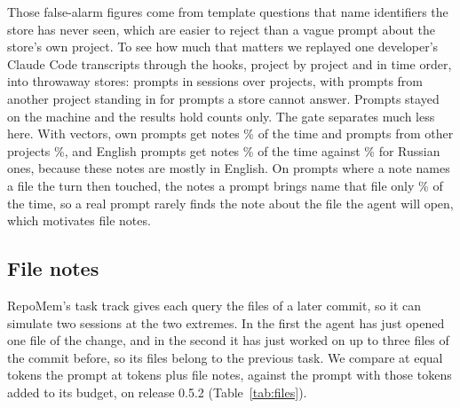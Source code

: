 \begin{table}[t]\centering\scriptsize
\caption{Query gate at  tokens. ``Spoke'' is the share of questions that got any notes. Own questions: their count, recall without and with the gate, and the share still answered with it. Foreign questions: the share that got notes without and with the gate. The main test uses twelve sampled streams and the shipped gates, and other rows are out of fold. RepoMem dev, holdout and earlier tests are repositories used in development.}\label{tab:gate}

\end{table}

Those false-alarm figures come from template questions that name identifiers the store has never seen, which are easier to reject than a vague prompt about the store's own project. To see how much that matters we replayed one developer's Claude Code transcripts through the hooks, project by project and in time order, into throwaway stores:  prompts in  sessions over  projects, with prompts from another project standing in for prompts a store cannot answer. Prompts stayed on the machine and the results hold counts only. The gate separates much less here. With vectors, own prompts get notes \% of the time and prompts from other projects \%, and English prompts get notes \% of the time against \% for Russian ones, because these notes are mostly in English. On prompts where a note names a file the turn then touched, the notes a prompt brings name that file only \% of the time, so a real prompt rarely finds the note about the file the agent will open, which motivates file notes.

\subsection{File notes}\label{sec:filenotes}
RepoMem's task track gives each query the files of a later commit, so it can simulate two sessions at the two extremes. In the first the agent has just opened one file of the change, and in the second it has just worked on up to three files of the commit before, so its files belong to the previous task. We compare at equal tokens the prompt at  tokens plus file notes, against the prompt with those tokens added to its budget, on release 0.5.2 (Table~\ref{tab:files}).

